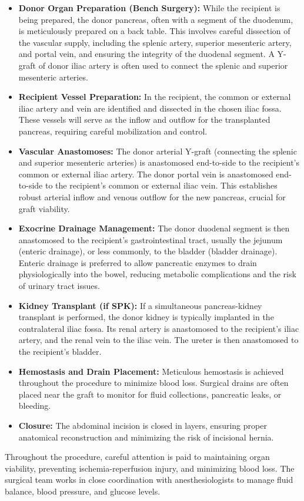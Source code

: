 \begin{itemize}
  \item \textbf{Donor Organ Preparation (Bench Surgery):} While the recipient is being prepared, the donor pancreas, often with a segment of the duodenum, is meticulously prepared on a back table. This involves careful dissection of the vascular supply, including the splenic artery, superior mesenteric artery, and portal vein, and ensuring the integrity of the duodenal segment. A Y-graft of donor iliac artery is often used to connect the splenic and superior mesenteric arteries.
  \item \textbf{Recipient Vessel Preparation:} In the recipient, the common or external iliac artery and vein are identified and dissected in the chosen iliac fossa. These vessels will serve as the inflow and outflow for the transplanted pancreas, requiring careful mobilization and control.
  \item \textbf{Vascular Anastomoses:} The donor arterial Y-graft (connecting the splenic and superior mesenteric arteries) is anastomosed end-to-side to the recipient's common or external iliac artery. The donor portal vein is anastomosed end-to-side to the recipient's common or external iliac vein. This establishes robust arterial inflow and venous outflow for the new pancreas, crucial for graft viability.
  \item \textbf{Exocrine Drainage Management:} The donor duodenal segment is then anastomosed to the recipient's gastrointestinal tract, usually the jejunum (enteric drainage), or less commonly, to the bladder (bladder drainage). Enteric drainage is preferred to allow pancreatic enzymes to drain physiologically into the bowel, reducing metabolic complications and the risk of urinary tract issues.
  \item \textbf{Kidney Transplant (if SPK):} If a simultaneous pancreas-kidney transplant is performed, the donor kidney is typically implanted in the contralateral iliac fossa. Its renal artery is anastomosed to the recipient's iliac artery, and the renal vein to the iliac vein. The ureter is then anastomosed to the recipient's bladder.
  \item \textbf{Hemostasis and Drain Placement:} Meticulous hemostasis is achieved throughout the procedure to minimize blood loss. Surgical drains are often placed near the graft to monitor for fluid collections, pancreatic leaks, or bleeding.
  \item \textbf{Closure:} The abdominal incision is closed in layers, ensuring proper anatomical reconstruction and minimizing the risk of incisional hernia.
\end{itemize}
Throughout the procedure, careful attention is paid to maintaining organ viability, preventing ischemia-reperfusion injury, and minimizing blood loss. The surgical team works in close coordination with anesthesiologists to manage fluid balance, blood pressure, and glucose levels.

